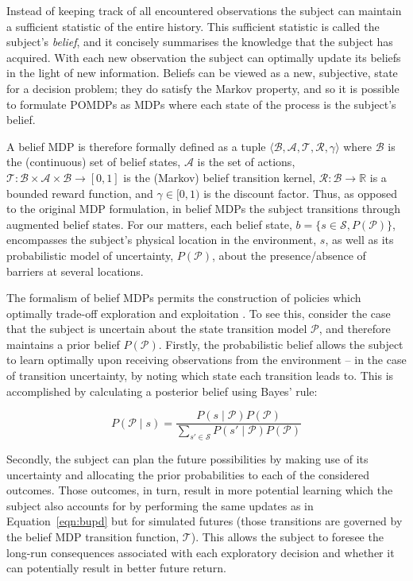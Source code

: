 Instead of keeping track of all encountered observations the subject can maintain a sufficient statistic of the entire history. This sufficient statistic is called the subject's \emph{belief}, and it concisely summarises the knowledge that the subject has acquired. With each new observation the subject can optimally update its beliefs in the light of new information. Beliefs can be viewed as a new, subjective, state for a decision problem; they do satisfy the Markov property, and so it is possible to formulate POMDPs as MDPs where each state of the process is the subject's belief. 

A belief MDP is therefore formally defined as a tuple $\langle \mathcal{B}, \mathcal{A}, \mathcal{T}, \mathcal{R}, \gamma \rangle$ where $\mathcal{B}$ is the (continuous) set of belief states, $\mathcal{A}$ is the set of actions, $\mathcal{T}: \mathcal{B} \times \mathcal{A} \times \mathcal{B} \rightarrow [0,1]$ is the (Markov) belief transition kernel, $\mathcal{R}:\mathcal{B}\rightarrow \mathbb{R}$ is a bounded reward function, and $\gamma \in [0, 1)$ is the discount factor. Thus, as opposed to the original MDP formulation, in belief MDPs the subject transitions through augmented belief states. For our matters, each belief state, $b=\{ s \in \mathcal{S}, P(\mathcal{P}) \}$, encompasses the subject's physical location in the environment, $s$, as well as its probabilistic model of uncertainty, $P(\mathcal{P})$, about the presence/absence of barriers at several locations.

The formalism of belief MDPs permits the construction of policies which optimally trade-off exploration and exploitation \parencite{guezSampleBasedSearchMethods2015}. To see this, consider the case that the subject is uncertain about the state transition model $\mathcal{P}$, and therefore maintains a prior belief $P(\mathcal{P})$. Firstly, the probabilistic belief allows the subject to learn optimally upon receiving observations from the environment -- in the case of transition uncertainty, by noting which state each transition leads to. This is accomplished by calculating a posterior belief using Bayes' rule:

\begin{equation}
    P(\mathcal{P} \mid s) = \frac{P(s\mid \mathcal{P})P(\mathcal{P})}{\sum_{s' \in \mathcal{S}}P(s'\mid \mathcal{P})P(\mathcal{P})}
    \label{eqn:bupd}
\end{equation}

Secondly, the subject can plan the future possibilities by making use of its uncertainty and allocating the prior probabilities to each of the considered outcomes. Those outcomes, in turn, result in more potential learning which the subject also accounts for by performing the same updates as in Equation~\ref{eqn:bupd} but for simulated futures (those transitions are governed by the belief MDP transition function, $\mathcal{T}$). This allows the subject to foresee the long-run consequences associated with each exploratory decision and whether it can potentially result in better future return.

